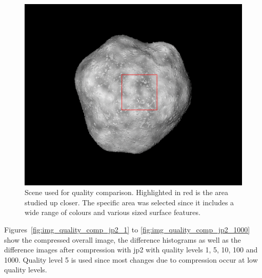 \begin{figure}[htb]
    \centering
    \includegraphics[width=.7\textwidth]{doc/thesis/0_figures/compare_quality/set1/jp2_1000_frame.png}
    \caption{Scene used for quality comparison. Highlighted in red is the area studied up closer. The specific area was selected since it includes a wide range of colours and various sized surface features.}
    \label{fig:img_quality_frame}
\end{figure}

Figures~\ref{fig:img_quality_comp_jp2_1} to \ref{fig:img_quality_comp_jp2_1000} show the compressed overall image, the difference histograms as well as the difference images after compression with \gls{jp2} with quality levels \SI{1}{}, \SI{5}{}, \SI{10}{}, \SI{100}{} and \SI{1000}{}. Quality level \SI{5}{} is used since most changes due to compression occur at low quality levels.

